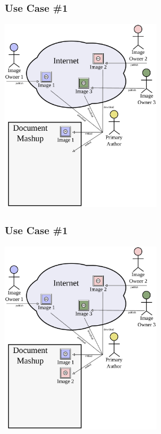\documentclass[mathserif,xcolor=dvipsnames,hyperref={bookmarks=true}]{beamer}
\begin{document}
    \begin{frame}[t]
        \frametitle{Use Case \#1}
        \begin{center}
            \includegraphics[width=0.51\textwidth]{../resources/usecases/usecase1/usecase1-step18.pdf}
        \end{center}
    \end{frame}
    \begin{frame}[t]
        \frametitle{Use Case \#1}
        \begin{center}
            \includegraphics[width=0.51\textwidth]{../resources/usecases/usecase1/usecase1-step19.pdf}
        \end{center}
    \end{frame}
\end{document}
